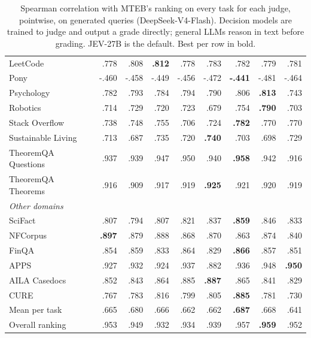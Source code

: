 \begin{table}[t]
\begin{tabular}{lrrrrrrrr}
LeetCode & .778 & .808 & \textbf{.812} & .778 & .783 & .782 & .779 & .781 \\
Pony & -.460 & -.458 & -.449 & -.456 & -.472 & \textbf{-.441} & -.481 & -.464 \\
Psychology & .782 & .793 & .784 & .794 & .790 & .806 & \textbf{.813} & .743 \\
Robotics & .714 & .729 & .720 & .723 & .679 & .754 & \textbf{.790} & .703 \\
Stack Overflow & .738 & .748 & .755 & .706 & .724 & \textbf{.782} & .770 & .770 \\
Sustainable Living & .713 & .687 & .735 & .720 & \textbf{.740} & .703 & .698 & .729 \\
TheoremQA Questions & .937 & .939 & .947 & .950 & .940 & \textbf{.958} & .942 & .916 \\
TheoremQA Theorems & .916 & .909 & .917 & .919 & \textbf{.925} & .921 & .920 & .919 \\
\midrule
\multicolumn{9}{l}{\textit{Other domains}} \\
SciFact & .807 & .794 & .807 & .821 & .837 & \textbf{.859} & .846 & .833 \\
NFCorpus & \textbf{.897} & .879 & .888 & .868 & .870 & .863 & .874 & .840 \\
FinQA & .854 & .859 & .833 & .864 & .829 & \textbf{.866} & .857 & .851 \\
APPS & .927 & .932 & .924 & .937 & .882 & .936 & .948 & \textbf{.950} \\
AILA Casedocs & .852 & .843 & .864 & .885 & \textbf{.887} & .865 & .841 & .829 \\
CURE & .767 & .783 & .816 & .799 & .805 & \textbf{.885} & .781 & .730 \\
\midrule
Mean per task & .665 & .680 & .666 & .662 & .662 & \textbf{.687} & .668 & .641 \\
Overall ranking & .953 & .949 & .932 & .934 & .939 & .957 & \textbf{.959} & .952 \\
\bottomrule
\end{tabular}
\caption{Spearman correlation with MTEB's ranking on every task for each judge, pointwise, on generated queries (DeepSeek-V4-Flash). Decision models are trained to judge and output a grade directly; general LLMs reason in text before grading. JEV-27B is the default. Best per row in bold.}
\label{tab:all_judges}
\end{table}
